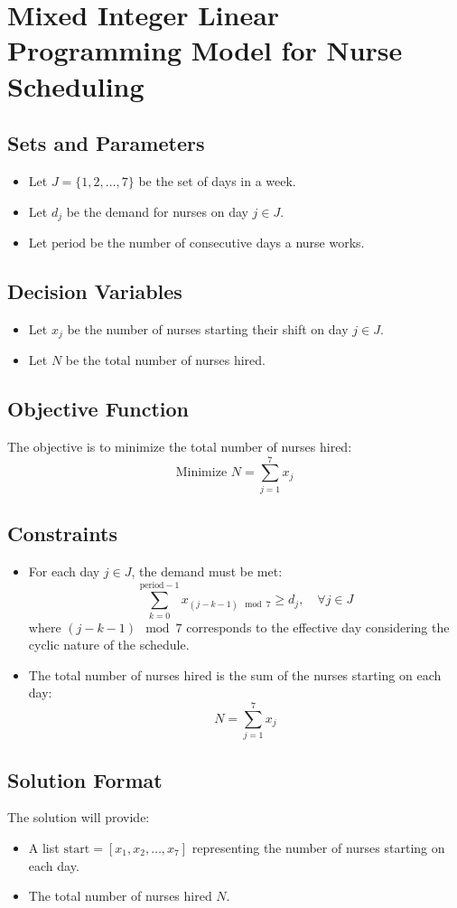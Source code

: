 \documentclass{article}
\begin{document}
\section*{Mixed Integer Linear Programming Model for Nurse Scheduling}

\subsection*{Sets and Parameters}
\begin{itemize}
    \item Let \( J = \{1, 2, \ldots, 7\} \) be the set of days in a week.
    \item Let \( d_j \) be the demand for nurses on day \( j \in J \).
    \item Let \( \text{period} \) be the number of consecutive days a nurse works.
\end{itemize}

\subsection*{Decision Variables}
\begin{itemize}
    \item Let \( x_j \) be the number of nurses starting their shift on day \( j \in J \).
    \item Let \( N \) be the total number of nurses hired.
\end{itemize}

\subsection*{Objective Function}
The objective is to minimize the total number of nurses hired:
\[
\text{Minimize } N = \sum_{j=1}^{7} x_j
\]

\subsection*{Constraints}
\begin{itemize}
    \item For each day \( j \in J \), the demand must be met:
    \[
    \sum_{k=0}^{\text{period}-1} x_{(j-k-1) \mod 7} \geq d_j, \quad \forall j \in J
    \]
    where \( (j-k-1) \mod 7 \) corresponds to the effective day considering the cyclic nature of the schedule.
    
    \item The total number of nurses hired is the sum of the nurses starting on each day:
    \[
    N = \sum_{j=1}^{7} x_j
    \]
\end{itemize}

\subsection*{Solution Format}
The solution will provide:
\begin{itemize}
    \item A list \( \text{start} = [x_1, x_2, \ldots, x_7] \) representing the number of nurses starting on each day.
    \item The total number of nurses hired \( N \).
\end{itemize}
\end{document}
